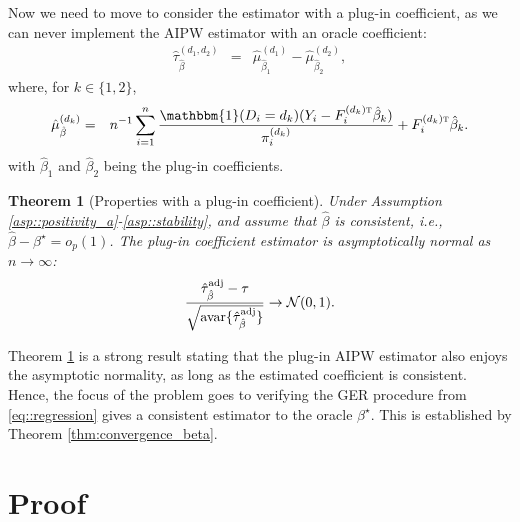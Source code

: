 \documentclass[twoside]{article}
\theoremstyle{plain}
\newtheorem{theorem}{Theorem}[section]
\theoremstyle{definition}
\theoremstyle{remark}
\def\T{{\textsc{t}}}
\newcommand{\avar}{\textup{avar}}
\newcommand{\cN}{\mathcal{N}}
\newcommand{\indicator}{\mathbbm{1}}
\newcommand{\sumi}{\sum_{i=1}^n}
\begin{document}
Now we need to move to consider the estimator with a plug-in coefficient, as we can never implement the AIPW estimator with an oracle coefficient:
\begin{eqnarray*}
    \hat\tau{}^{(d_1, d_2)}_{\hat\beta} &=& \hat\mu{}^{(d_1)}_{\hat\beta_1} - \hat\mu{}^{(d_2)}_{\hat\beta_2},
\end{eqnarray*}
where, for $k \in \{1,2\}$,
\begin{eqnarray*}
    \hat\mu^{(d_k)}_{\hat\beta} &=& n^{-1}\sumi\frac{\indicator(D_i=d_k)(Y_i-F_i^{(d_k)\T} \hat\beta_k)}{\pi_i^{(d_k)}} + F_i^{(d_k)\T} \hat\beta_k.
\end{eqnarray*}
with $\hat\beta_1$ and $\hat\beta_2$ being the plug-in coefficients.
\begin{theorem}[Properties with a plug-in coefficient]\label{thm:plug_in}
    Under Assumption \ref{asp::positivity_a}-\ref{asp::stability}, and assume that $\hat\beta$ is consistent, i.e., $\hat\beta - \beta^\star = o_p(1)$. The plug-in coefficient estimator is asymptotically normal as $n\to\infty$:
    \begin{eqnarray*}
        \frac{\hat\tau^{\textup{adj}}_{\hat{\beta}} - \tau}{\sqrt{\avar\{\hat\tau^{\textup{adj}}_{\hat\beta}\}}} \rightarrow \cN(0, 1).
    \end{eqnarray*}
\end{theorem}
Theorem \ref{thm:plug_in} is a strong result stating that the plug-in AIPW estimator also enjoys the asymptotic normality, as long as the estimated coefficient is consistent. Hence, the focus of the problem goes to verifying the GER procedure from \eqref{eq::regression} gives a consistent estimator to the oracle $\beta^\star$. This is established by Theorem \ref{thm:convergence_beta}.

\section{Proof}\label{sec:proof}
\end{document}

